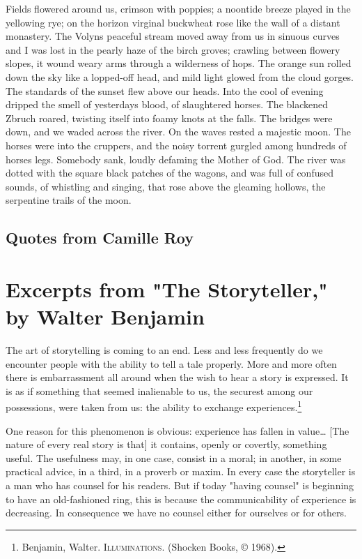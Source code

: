 \documentclass[
]{memoir}
\begin{document}
Fields flowered around us, crimson with poppies; a noontide breeze
played in the yellowing rye; on the horizon virginal buckwheat rose like
the wall of a distant monastery. The Volyns peaceful stream moved away
from us in sinuous curves and I was lost in the pearly haze of the birch
groves; crawling between flowery slopes, it wound weary arms through a
wilderness of hops. The orange sun rolled down the sky like a lopped-off
head, and mild light glowed from the cloud gorges. The standards of the
sunset flew above our heads. Into the cool of evening dripped the smell
of yesterdays blood, of slaughtered horses. The blackened Zbruch roared,
twisting itself into foamy knots at the falls. The bridges were down,
and we waded across the river. On the waves rested a majestic moon. The
horses were into the cruppers, and the noisy torrent gurgled among
hundreds of horses legs. Somebody sank, loudly defaming the Mother of
God. The river was dotted with the square black patches of the wagons,
and was full of confused sounds, of whistling and singing, that rose
above the gleaming hollows, the serpentine trails of the moon.

\hypertarget{quotes-from-camille-roy}{%
\section*{Quotes from Camille Roy}\label{quotes-from-camille-roy}}

\hypertarget{excerpts-from-the-storyteller-by-walter-benjamin}{%
\chapter{Excerpts from "The Storyteller," by Walter
Benjamin}\label{excerpts-from-the-storyteller-by-walter-benjamin}}

The art of storytelling is coming to an end. Less and less frequently do
we encounter people with the ability to tell a tale properly. More and
more often there is embarrassment all around when the wish to hear a
story is expressed. It is as if something that seemed inalienable to us,
the securest among our possessions, were taken from us: the ability to
exchange experiences.\footnote{Benjamin, Walter. \textsc{Illuminations}.
  (Shocken Books, © 1968).}

One reason for this phenomenon is obvious: experience has fallen in
value\ldots{} {[}The nature of every real story is that{]} it contains,
openly or covertly, something useful. The usefulness may, in one case,
consist in a moral; in another, in some practical advice, in a third, in
a proverb or maxim. In every case the storyteller is a man who has
counsel for his readers. But if today "having counsel" is beginning to
have an old-fashioned ring, this is because the communicability of
experience is decreasing. In consequence we have no counsel either for
ourselves or for others.
\end{document}
